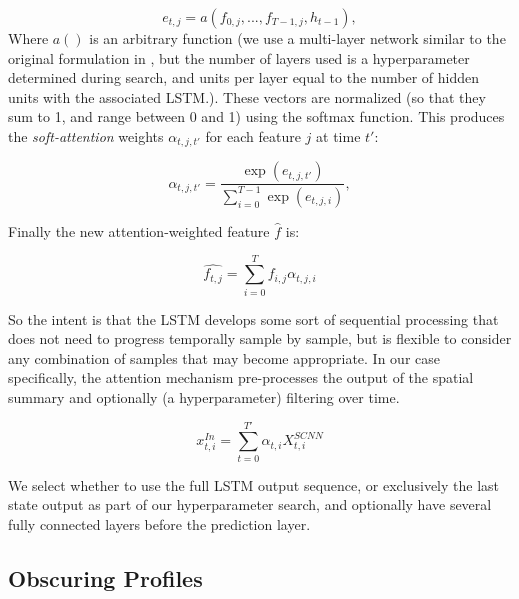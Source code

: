 \documentclass[fleqn,10pt]{wlscirep}
\begin{document}
\begin{equation} 
  e_{t, j} = a(f_{0, j},..., f_{T-1, j}, h_{t-1}),
\end{equation}
Where $a()$ is an arbitrary function (we use a multi-layer network similar to the original formulation in \cite{Zhu}, but the number of layers used is a hyperparameter determined during search, and units per layer equal to the number of hidden units with the associated LSTM.). These vectors are normalized (so that they sum to 1, and range between 0 and 1) using the softmax function. This produces the {\em soft-attention} weights $\alpha_{t,j,t'}$ for each feature $j$ at time $t'$:

\begin{equation} \label{eq:attn_nrg}
  \alpha_{t,j,t'} =  \frac{\exp(e_{t,j,t'})}{\sum_{i=0}^{T-1}\exp(e_{t,j,i})},
\end{equation}

Finally the new attention-weighted feature $\hat{f}$ is: 

\begin{equation} \label{eq:attn}
    \hat{f_{t,j}} = \sum_{i=0}^{T} f_{i,j} \alpha_{t,j,i}
\end{equation}

So the intent is that the LSTM develops some sort of sequential processing that does not need to progress temporally sample by sample, but is flexible to consider any combination of samples that may become appropriate. In our case specifically, the attention mechanism pre-processes the output of the spatial summary and optionally (a hyperparameter) filtering over time.

\begin{equation}
  x_{t,i}^{In} = \sum_{t=0}^{T'} \alpha_{t,i} X_{t,i}^{SCNN}
\end{equation}

We select whether to use the full LSTM output sequence, or exclusively the last state output as part of our hyperparameter search, and optionally have several fully connected layers before the prediction layer.

\subsection*{Obscuring Profiles}
\end{document}
